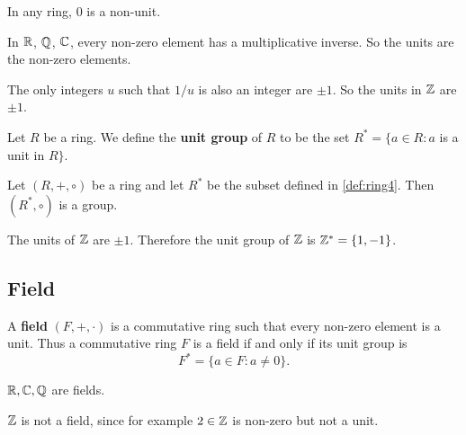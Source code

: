 \documentclass[12pt]{book}
\begin{document}
\begin{examp}\label{exp:ring3}
      In any ring, $0$ is a non-unit.     
\end{examp}
\begin{examp}\label{exp:ring4}
      In $\mathbb{R}$, $\mathbb{Q}$, $\mathbb{C}$, every non-zero element has a multiplicative inverse. So the units are the non-zero elements.     
\end{examp}
\begin{examp}\label{exp:ring5}
      The only integers $u$ such that $1/u$ is also an integer are $\pm 1$. So the units in $\mathbb{Z}$ are $\pm 1$.    
\end{examp}

\begin{defi}\label{def:ring4}
      Let $R$ be a ring. We define the \textbf{unit group} of $R$ to be the set
	  $R^* = \{a \in R : a$ is  a unit in $R \}.$
\end{defi}
\begin{lem}\label{lem::ring5}
      Let $(R,+, \circ)$ be a ring and let $R^*$ be the subset defined in \ref{def:ring4}. Then $(R^*, \circ)$ is a group.
\end{lem}

\begin{examp}\label{exp:ring6}
      The units of $\mathbb{Z}$ are $\pm 1$. Therefore the unit group of $\mathbb{Z}$ is $\mathbb{Z} ^* = \{1,-1 \}$.  
\end{examp}
\subsection{Field}
\label{sec:Field}

\begin{defi}\label{def:field}
      A \textbf{field} $(F,+,\cdot)$ is a commutative ring such that every non-zero element is a unit. Thus a commutative ring $F$ is a field 
	  if and only if its unit group is
	  $$F^*= \{a \in F : a \not = 0 \}.$$
\end{defi}
\begin{examp}\label{exp:field1}
      $\mathbb{R}, \mathbb{C}, \mathbb{Q}$ are fields.
\end{examp} 
\begin{examp}\label{exp:field2}
      $\mathbb{Z}$ is not a field, since for example $2 \in \mathbb{Z}$ is non-zero but not a unit.
\end{examp}

\end{document}
